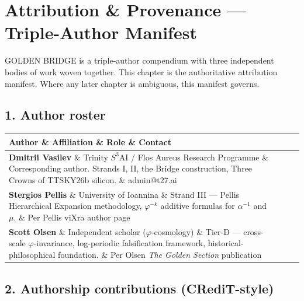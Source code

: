 
\section{Attribution \& Provenance --- Triple-Author Manifest}

GOLDEN BRIDGE is a triple-author compendium with three independent bodies of work woven together. This chapter is the authoritative attribution manifest. Where any later chapter is ambiguous, this manifest governs.

\subsection{1. Author roster}

\begin{tabular}{|l|l|l|l|}
\hline
Author \& Affiliation \& Role \& Contact \\
\hline
\textbf{Dmitrii Vasilev} \& Trinity $S^{3}$AI / Flos Aureus Research Programme \& Corresponding author. Strands I, II, the Bridge construction, Three Crowns of TTSKY26b silicon. \& admin@t27.ai \\
\textbf{Stergios Pellis} \& University of Ioannina \& Strand III --- Pellis Hierarchical Expansion methodology, $\varphi^{-k}$ additive formulas for $\alpha^{-1}$ and $\mu$. \& Per Pellis viXra author page \\
\textbf{Scott Olsen} \& Independent scholar ($\varphi$-cosmology) \& Tier-D --- cross-scale $\varphi$-invariance, log-periodic falsification framework, historical-philosophical foundation. \& Per Olsen \textit{The Golden Section} publication \\
\hline
\end{tabular}
\subsection{2. Authorship contributions (CRediT-style)}

